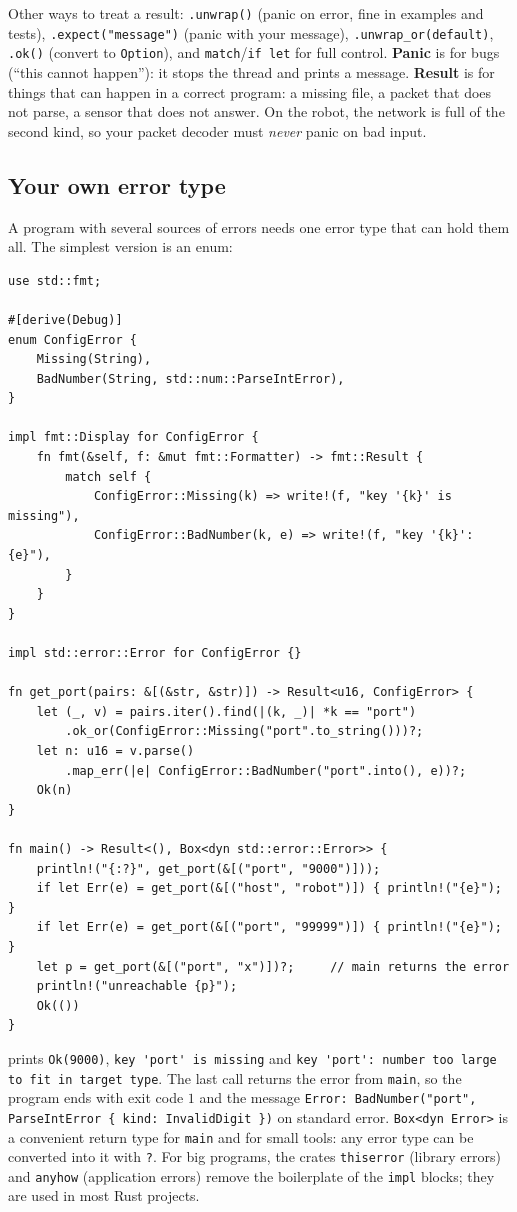 Other ways to treat a result: \verb!.unwrap()! (panic on error, fine in examples and tests), \verb!.expect("message")! (panic with your message), \verb!.unwrap_or(default)!, \verb!.ok()! (convert to \verb!Option!), and \verb!match!/\verb!if let! for full control. \textbf{Panic} is for bugs (``this cannot happen''): it stops the thread and prints a message. \textbf{Result} is for things that can happen in a correct program: a missing file, a packet that does not parse, a sensor that does not answer. On the robot, the network is full of the second kind, so your packet decoder must \emph{never} panic on bad input.

\subsection*{Your own error type}
A program with several sources of errors needs one error type that can hold them all. The simplest version is an enum:
\begin{verbatim}
use std::fmt;

#[derive(Debug)]
enum ConfigError {
    Missing(String),
    BadNumber(String, std::num::ParseIntError),
}

impl fmt::Display for ConfigError {
    fn fmt(&self, f: &mut fmt::Formatter) -> fmt::Result {
        match self {
            ConfigError::Missing(k) => write!(f, "key '{k}' is missing"),
            ConfigError::BadNumber(k, e) => write!(f, "key '{k}': {e}"),
        }
    }
}

impl std::error::Error for ConfigError {}

fn get_port(pairs: &[(&str, &str)]) -> Result<u16, ConfigError> {
    let (_, v) = pairs.iter().find(|(k, _)| *k == "port")
        .ok_or(ConfigError::Missing("port".to_string()))?;
    let n: u16 = v.parse()
        .map_err(|e| ConfigError::BadNumber("port".into(), e))?;
    Ok(n)
}

fn main() -> Result<(), Box<dyn std::error::Error>> {
    println!("{:?}", get_port(&[("port", "9000")]));
    if let Err(e) = get_port(&[("host", "robot")]) { println!("{e}"); }
    if let Err(e) = get_port(&[("port", "99999")]) { println!("{e}"); }
    let p = get_port(&[("port", "x")])?;     // main returns the error
    println!("unreachable {p}");
    Ok(())
}
\end{verbatim}
prints \verb!Ok(9000)!, \verb!key 'port' is missing! and \verb!key 'port': number too large to fit in target type!. The last call returns the error from \verb!main!, so the program ends with exit code $1$ and the message \verb!Error: BadNumber("port", ParseIntError { kind: InvalidDigit })! on standard error. \verb!Box<dyn Error>! is a convenient return type for \verb!main! and for small tools: any error type can be converted into it with \verb!?!. For big programs, the crates \verb!thiserror! (library errors) and \verb!anyhow! (application errors) remove the boilerplate of the \verb!impl! blocks; they are used in most Rust projects.

